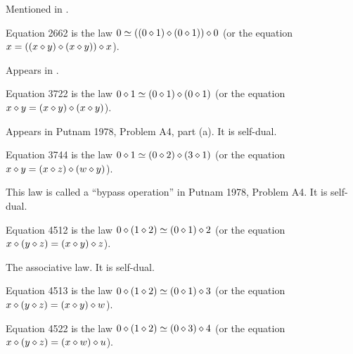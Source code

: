 Mentioned in \cite{Kisielewicz2}.

\begin{definition}[Equation 2662]\label{eq2662}\leanok{}  Equation 2662 is the law $0 \simeq  ((0 \diamond 1) \diamond (0 \diamond 1)) \diamond 0$ (or the equation $x = ((x \diamond y) \diamond (x \diamond y)) \diamond x$).
\end{definition}

Appears in \cite{mendelsohn-padmanabhan}.

\begin{definition}[Equation 3722]\label{eq3722}\leanok{}  Equation 3722 is the law $0 \diamond 1  \simeq  (0 \diamond 1) \diamond (0 \diamond 1)$ (or the equation $x \diamond y = (x \diamond y) \diamond (x \diamond y)$).
\end{definition}

Appears in Putnam 1978, Problem A4, part (a).  It is self-dual.

\begin{definition}[Equation 3744]\label{eq3744}\leanok{}  Equation 3744 is the law $0 \diamond 1  \simeq  (0 \diamond 2) \diamond (3 \diamond 1)$ (or the equation $x \diamond y = (x \diamond z) \diamond (w \diamond y)$).
\end{definition}

This law is called a ``bypass operation'' in Putnam 1978, Problem A4. It is self-dual.

\begin{definition}[Equation 4512]\label{eq4512}\leanok{}  Equation 4512 is the law $0 \diamond (1 \diamond 2)  \simeq  (0 \diamond 1) \diamond 2$ (or the equation $x \diamond (y \diamond z) = (x \diamond y) \diamond z$).
\end{definition}

The associative law. It is self-dual.

\begin{definition}[Equation 4513]\label{eq4513}\leanok{}  Equation 4513 is the law $0 \diamond (1 \diamond 2)  \simeq  (0 \diamond 1) \diamond 3$ (or the equation $x \diamond (y \diamond z) = (x \diamond y) \diamond w$).
\end{definition}

\begin{definition}[Equation 4522]\label{eq4522}\leanok{}  Equation 4522 is the law $0 \diamond (1 \diamond 2)  \simeq  (0 \diamond 3) \diamond 4$ (or the equation $x \diamond (y \diamond z) = (x \diamond w) \diamond u$).
\end{definition}


